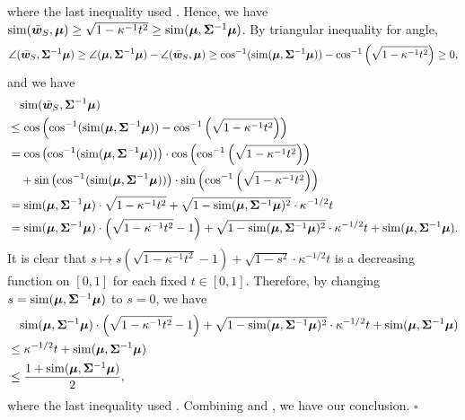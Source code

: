 where the last inequality used .
Hence, we have $\mathrm{sim}(\bar{{\bm{w}}}_S, {\bm{\mu}}) \geq \sqrt{1-\kappa^{-1} t^2} \geq \mathrm{sim}({\bm{\mu}}, {\bm{\Sigma}}^{-1}{\bm{\mu}})$. By triangular inequality for angle, 
\begin{equation*}
    \angle(\bar{{\bm{w}}}_S, {\bm{\Sigma}}^{-1}{\bm{\mu}}) \geq \angle({\bm{\mu}}, {\bm{\Sigma}}^{-1}{\bm{\mu}}) - \angle(\bar{{\bm{w}}}_S, {\bm{\mu}})\geq \cos^{-1}(\mathrm{sim}({\bm{\mu}}, {\bm{\Sigma}}^{-1}{\bm{\mu}})) - \cos^{-1}\left(\sqrt{1-\kappa^{-1}t^2}\right)\geq 0,
\end{equation*}
and we have
\begin{align}\label{eqn:ERM_Necessary-1}
    &\quad \mathrm{sim} (\bar{{\bm{w}}}_S, {\bm{\Sigma}}^{-1}{\bm{\mu}}) \nonumber \\
    & \leq \cos \left( \cos^{-1}(\mathrm{sim}({\bm{\mu}}, {\bm{\Sigma}}^{-1}{\bm{\mu}})) - \cos^{-1}\left(\sqrt{1-\kappa^{-1}t^2}\right) \right)\nonumber \\
    &= \cos \left(\cos^{-1}(\mathrm{sim}({\bm{\mu}}, {\bm{\Sigma}}^{-1}{\bm{\mu}}))\right)\cdot  \cos \left(\cos^{-1}\left(\sqrt{1-\kappa^{-1}t^2}\right)\right)\nonumber \\
    &\quad + \sin \left(\cos^{-1}(\mathrm{sim}({\bm{\mu}}, {\bm{\Sigma}}^{-1}{\bm{\mu}}))\right) \cdot \sin \left(\cos^{-1}\left(\sqrt{1-\kappa^{-1}t^2}\right)\right) \nonumber \\
    &= \mathrm{sim}({\bm{\mu}}, {\bm{\Sigma}}^{-1}{\bm{\mu}}) \cdot \sqrt{1-\kappa^{-1}t^2} + \sqrt{1-\mathrm{sim}({\bm{\mu}}, {\bm{\Sigma}}^{-1}{\bm{\mu}})^2} \cdot \kappa^{-1/2}t\nonumber \\
    &= \mathrm{sim}({\bm{\mu}}, {\bm{\Sigma}}^{-1}{\bm{\mu}})\cdot \left (\sqrt{1-\kappa^{-1}t^2}-1\right) + \sqrt{1-\mathrm{sim}({\bm{\mu}}, {\bm{\Sigma}}^{-1}{\bm{\mu}})^2} \cdot \kappa^{-1/2} t + \mathrm{sim}({\bm{\mu}}, {\bm{\Sigma}}^{-1}{\bm{\mu}}).
\end{align}
It is clear that $s \mapsto s\left (\sqrt{1-\kappa^{-1}t^2}-1\right) + \sqrt{1-s^2}\cdot \kappa^{-1/2}t$ is a decreasing function on $[0,1]$ for each fixed $t\in[0,1]$. Therefore, by changing $s = \mathrm{sim}({\bm{\mu}}, {\bm{\Sigma}}^{-1}{\bm{\mu}})$ to $s = 0$, we have
\begin{align}\label{eqn:ERM_Necessary-2}
&\quad \mathrm{sim}({\bm{\mu}}, {\bm{\Sigma}}^{-1}{\bm{\mu}}) \cdot \left(\sqrt{1-\kappa^{-1}t^2}-1\right) + \sqrt{1-\mathrm{sim}({\bm{\mu}}, {\bm{\Sigma}}^{-1}{\bm{\mu}})^2}\cdot \kappa^{-1/2} t + \mathrm{sim}({\bm{\mu}}, {\bm{\Sigma}}^{-1}{\bm{\mu}})\nonumber \\
&\leq \kappa^{-1/2}t + \mathrm{sim}({\bm{\mu}}, {\bm{\Sigma}}^{-1}{\bm{\mu}})\nonumber \\
&\leq \frac{1+\mathrm{sim}({\bm{\mu}}, {\bm{\Sigma}}^{-1}{\bm{\mu}})}{2},
\end{align}
where the last inequality used . 
Combining  and , we have our conclusion. \hfill $\square$